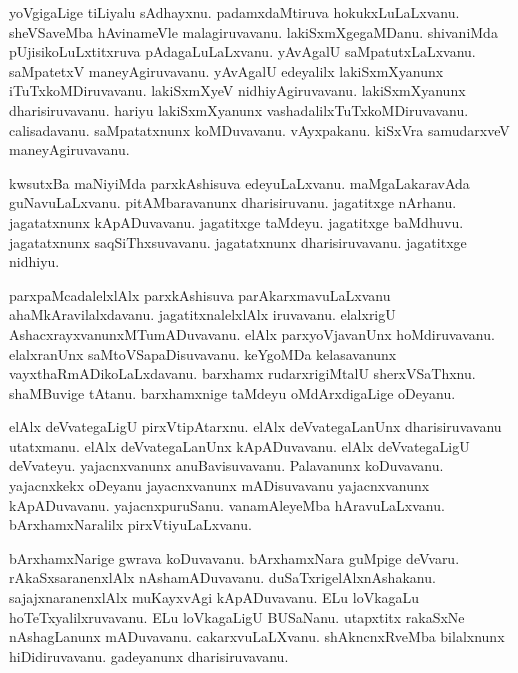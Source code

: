 \documentclass{article}
\begin{document}
\begin{mn}%
yoVgigaLige tiLiyalu sAdhayxnu. padamxdaMtiruva hokukxLuLaLxvanu. sheVSaveMba hAvinameVle 
malagiruvavanu. lakiSxmXgegaMDanu. shivaniMda pUjisikoLuLxtitxruva pAdagaLuLaLxvanu. yAvAgalU 
saMpatutxLaLxvanu. saMpatetxV maneyAgiruvavanu. yAvAgalU edeyalilx lakiSxmXyanunx 
iTuTxkoMDiruvavanu. lakiSxmXyeV nidhiyAgiruvavanu. lakiSxmXyanunx dharisiruvavanu. hariyu 
lakiSxmXyanunx vashadalilxTuTxkoMDiruvavanu. calisadavanu. saMpatatxnunx koMDuvavanu. vAyxpakanu. 
kiSxVra samudarxveV maneyAgiruvavanu.
\end{mn}

\begin{mn}%
kwsutxBa maNiyiMda parxkAshisuva edeyuLaLxvanu. maMgaLakaravAda guNavuLaLxvanu. pitAMbaravanunx 
dharisiruvanu. jagatitxge nArhanu. jagatatxnunx kApADuvavanu. jagatitxge taMdeyu. jagatitxge 
baMdhuvu. jagatatxnunx saqSiThxsuvavanu. jagatatxnunx dharisiruvavanu. jagatitxge nidhiyu.
\end{mn}

\begin{mn}%
parxpaMcadalelxlAlx parxkAshisuva parAkarxmavuLaLxvanu ahaMkAravilalxdavanu. jagatitxnalelxlAlx 
iruvavanu. elalxrigU AshacxrayxvanunxMTumADuvavanu. elAlx parxyoVjavanUnx hoMdiruvavanu. 
elalxranUnx saMtoVSapaDisuvavanu. keYgoMDa kelasavanunx vayxthaRmADikoLaLxdavanu. barxhamx 
rudarxrigiMtalU sherxVSaThxnu. shaMBuvige tAtanu. barxhamxnige taMdeyu oMdArxdigaLige oDeyanu.
\end{mn}

\begin{mn}%
elAlx deVvategaLigU pirxVtipAtarxnu. elAlx deVvategaLanUnx dharisiruvavanu utatxmanu. elAlx 
deVvategaLanUnx kApADuvavanu. elAlx deVvategaLigU deVvateyu. yajacnxvanunx anuBavisuvavanu. 
Palavanunx koDuvavanu. yajacnxkekx oDeyanu jayacnxvanunx mADisuvavanu yajacnxvanunx kApADuvavanu. 
yajacnxpuruSanu. vanamAleyeMba hAravuLaLxvanu. bArxhamxNaralilx pirxVtiyuLaLxvanu.
\end{mn}

\begin{mn}%
bArxhamxNarige gwrava koDuvavanu. bArxhamxNara guMpige deVvaru. rAkaSxsaranenxlAlx nAshamADuvavanu. 
duSaTxrigelAlxnAshakanu. sajajxnaranenxlAlx muKayxvAgi kApADuvavanu. ELu loVkagaLu 
hoTeTxyalilxruvavanu. ELu loVkagaLigU BUSaNanu. utapxtitx rakaSxNe nAshagLanunx mADuvavanu. 
cakarxvuLaLXvanu. shAkncnxRveMba bilalxnunx hiDidiruvavanu. gadeyanunx dharisiruvavanu.
\end{mn}
\end{document}

